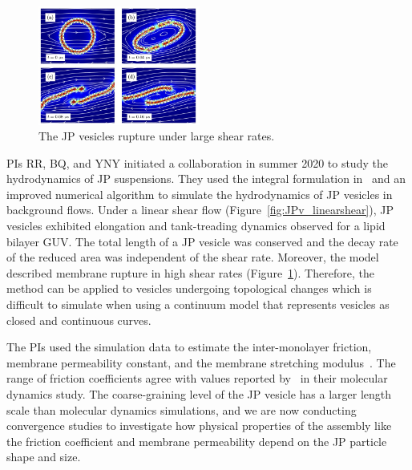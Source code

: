 \begin{figure}
\includegraphics[width=0.475\textwidth]{figures/PreliminaryWork/Rupture.jpg}
\caption{\label{fig:JPv_rupture}The JP vesicles rupture under large shear rates.}
\end{figure}
%
PIs RR, BQ, and YNY initiated a collaboration in summer 2020 to study
the hydrodynamics of JP suspensions. They used the integral formulation
in~\cite{Fu2018_SIAM} and an improved numerical algorithm to simulate
the hydrodynamics of JP vesicles in background flows. Under a linear
shear flow (Figure~\ref{fig:JPv_linearshear}), JP vesicles exhibited
elongation and tank-treading dynamics observed for a lipid bilayer GUV.
The total length of a JP vesicle was conserved and the decay rate of the
reduced area was independent of the shear rate.  Moreover, the
model described membrane rupture in high shear rates
(Figure~\ref{fig:JPv_rupture}). Therefore, the method can be applied to
vesicles undergoing topological changes which is difficult to simulate
when using a continuum model that represents vesicles as closed and
continuous curves.
%
%

%
%
The PIs used the simulation data to estimate the inter-monolayer
friction, membrane permeability constant, and the membrane
stretching modulus~\cite{chabanon2017, sch_vla_mik2010}. The range
of friction coefficients agree with values reported
by~\cite{denOtter2007,WuoEd06} in their molecular dynamics study. The
coarse-graining level of the JP vesicle has a larger length scale than
molecular dynamics simulations, and we are now conducting convergence
studies to investigate how physical properties of the assembly like the
friction coefficient and membrane permeability depend on the JP particle
shape and size.

